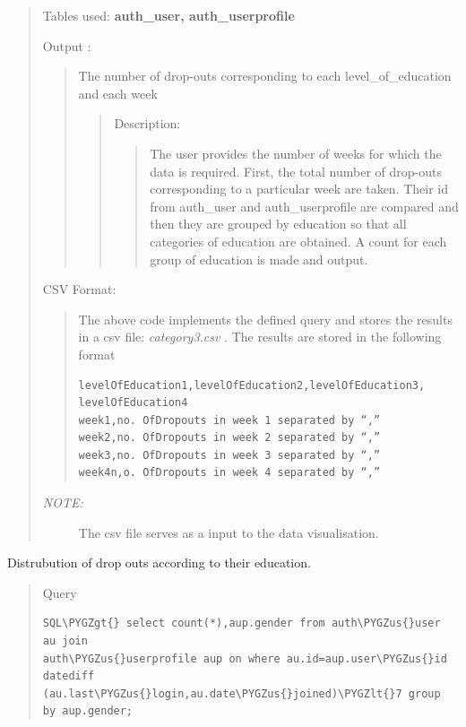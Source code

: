 \documentclass[a4paper,12pt,oneside]{sphinxmanual}
\def\PYGZus{\char`\_}
\def\PYGZlt{\char`\<}
\def\PYGZgt{\char`\>}
\begin{document}
\begin{itemize}
\begin{quote}
Tables used: \textbf{auth\_user, auth\_userprofile}

Output :
\begin{quote}

The number of drop-outs corresponding to each level\_of\_education and each week
\begin{quote}

Description:
\begin{quote}

The user provides the number of weeks for which the data is required.
First, the total number of drop-outs corresponding to a particular week are taken.
Their id from auth\_user and auth\_userprofile are compared and then they are grouped by education so that all categories of education are obtained.
A count for each group of education is made and output.
\end{quote}
\end{quote}
\end{quote}

CSV Format:
\begin{quote}

The above code implements the defined query and stores the results in a csv file: \emph{category3.csv} .
The results are stored in the following format

\begin{Verbatim}[commandchars=\\\{\}]
levelOfEducation1,levelOfEducation2,levelOfEducation3,
levelOfEducation4
week1,no. OfDropouts in week 1 separated by “,”
week2,no. OfDropouts in week 2 separated by “,”
week3,no. OfDropouts in week 3 separated by “,”
week4n,o. OfDropouts in week 4 separated by “,”
\end{Verbatim}
\end{quote}
\begin{description}
\item[{\emph{NOTE:}}] \leavevmode
The csv file serves as a input to the data visualisation.

\end{description}
\end{quote}

Distrubution of drop outs according to their education.
\begin{quote}

Query

\begin{Verbatim}[commandchars=\\\{\}]
SQL\PYGZgt{} select count(*),aup.gender from auth\PYGZus{}user au join
auth\PYGZus{}userprofile aup on where au.id=aup.user\PYGZus{}id datediff
(au.last\PYGZus{}login,au.date\PYGZus{}joined)\PYGZlt{}7 group by aup.gender;
\end{Verbatim}


\end{quote}
\end{itemize}
\end{document}
